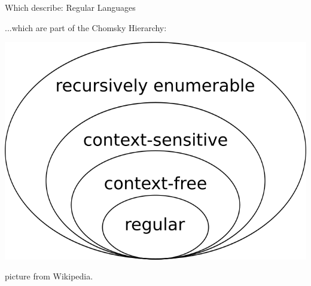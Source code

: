 \documentclass{beamer}
\begin{document}
\begin{frame}{Which describe: Regular Languages}

  ...which are part of the Chomsky Hierarchy:

  \includegraphics[width=.8\textwidth]{figures/chomsky-hier}

\tiny
picture from Wikipedia.
\end{frame}

\end{document}
